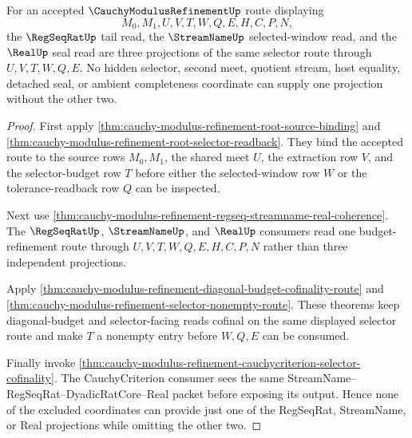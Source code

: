 \begin{theorem}
\label{thm:cauchy-modulus-refinement-regseq-real-selector-exactness}
For an accepted $\CauchyModulusRefinementUp$ route displaying
$$
M_0,M_1,U,V,T,W,Q,E,H,C,P,N,
$$
the $\RegSeqRatUp$ tail read, the $\StreamNameUp$ selected-window read, and the $\RealUp$ seal read are three projections of the same selector route through $U,V,T,W,Q,E$. No hidden selector, second meet, quotient stream, host equality, detached seal, or ambient completeness coordinate can supply one projection without the other two.
\end{theorem}
\begin{proof}
First apply \autoref{thm:cauchy-modulus-refinement-root-source-binding} and \autoref{thm:cauchy-modulus-refinement-root-selector-readback}. They bind the accepted route to the source rows $M_0,M_1$, the shared meet $U$, the extraction row $V$, and the selector-budget row $T$ before either the selected-window row $W$ or the tolerance-readback row $Q$ can be inspected.

Next use \autoref{thm:cauchy-modulus-refinement-regseq-streamname-real-coherence}. The $\RegSeqRatUp$, $\StreamNameUp$, and $\RealUp$ consumers read one budget-refinement route through $U,V,T,W,Q,E,H,C,P,N$ rather than three independent projections.

Apply \autoref{thm:cauchy-modulus-refinement-diagonal-budget-cofinality-route} and \autoref{thm:cauchy-modulus-refinement-selector-nonempty-route}. These theorems keep diagonal-budget and selector-facing reads cofinal on the same displayed selector route and make $T$ a nonempty entry before $W,Q,E$ can be consumed.

Finally invoke \autoref{thm:cauchy-modulus-refinement-cauchycriterion-selector-cofinality}. The CauchyCriterion consumer sees the same StreamName--RegSeqRat--DyadicRatCore--Real packet before exposing its output. Hence none of the excluded coordinates can provide just one of the RegSeqRat, StreamName, or Real projections while omitting the other two.
\end{proof}

